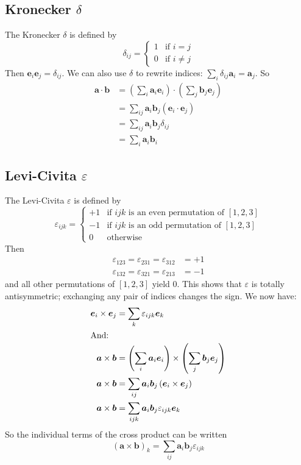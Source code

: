 \documentclass{article}
\begin{document}
\subsection{Kronecker $\delta$}
The Kronecker $\delta$ is defined by
\[ \delta_{ij} = \begin{cases}
		1 & \text{if } i = j    \\
		0 & \text{if } i \neq j
	\end{cases} \]
Then $\bm e_i \bm e_j = \delta_{ij}$. We can also use $\delta$ to rewrite indices: $\sum_i \delta_{ij} \bm a_i = \bm a_j$. So
\begin{align*}
	\bm a \cdot \bm b & = \left( \sum_i \bm a_i \bm e_i \right) \cdot \left( \sum_j \bm b_j \bm e_j \right) \\
	                  & = \sum_{ij} \bm a_i \bm b_j (\bm e_i \cdot \bm e_j)                                 \\
	                  & = \sum_{ij} \bm a_i \bm b_j \delta_{ij}                                             \\
	                  & = \sum_i \bm a_i \bm b_i
\end{align*}

\subsection{Levi-Civita $\varepsilon$}
The Levi-Civita $\varepsilon$ is defined by
\[
	\varepsilon_{ijk} = \begin{cases}
		+1 & \text{if } ijk \text{ is an even permutation of } [1, 2, 3] \\
		-1 & \text{if } ijk \text{ is an odd permutation of } [1, 2, 3]  \\
		0  & \text{otherwise}
	\end{cases}
\]
Then
\begin{align*}
	\varepsilon_{123} = \varepsilon_{231} = \varepsilon_{312} & = +1 \\
	\varepsilon_{132} = \varepsilon_{321} = \varepsilon_{213} & = -1
\end{align*}
and all other permutations of $[1, 2, 3]$ yield 0. This shows that $\varepsilon$ is totally antisymmetric; exchanging any pair of indices changes the sign. We now have:
\begin{align*}
	\bm e_i \times \bm e_j & = \sum_k \varepsilon_{ijk} \bm e_k                                                   \\
	\intertext{And:}
	\bm a \times \bm b     & = \left( \sum_i \bm a_i \bm e_i \right) \times \left( \sum_j \bm b_j \bm e_j \right) \\
	\bm a \times \bm b     & = \sum_{ij} \bm a_i \bm b_j \left( \bm e_i \times \bm e_j \right)                    \\
	\bm a \times \bm b     & = \sum_{ijk} \bm a_i \bm b_j \varepsilon_{ijk} \bm e_k
\end{align*}
So the individual terms of the cross product can be written
\[ (\bm a \times \bm b)_k = \sum_{ij} \bm a_i \bm b_j \varepsilon_{ijk} \]
\end{document}
